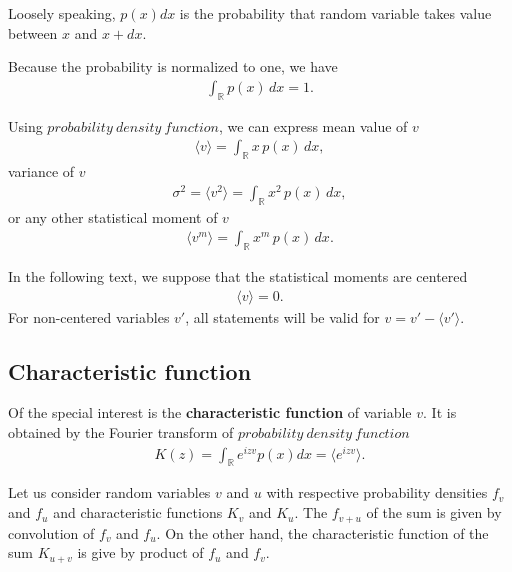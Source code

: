 Loosely speaking, $p(x)dx$ is the probability that random variable takes value between $x$ and $x+dx$.

Because the probability is normalized to one, we have
\begin{align}
\int_{\mathbb{R}} p(x) \, dx = 1.
\end{align}

Using $probability~density~function$, we can express mean value of $v$
\begin{align}
\langle v \rangle = \int_{\mathbb{R}} x \, p(x) \, dx ,
\end{align}
variance of $v$
\begin{align}
\sigma^2 = \langle v^2 \rangle = \int_{\mathbb{R}} x^2 \, p(x) \, dx ,
\end{align}
or any other statistical moment of $v$
\begin{align}
\langle v^m \rangle = \int_{\mathbb{R}} x^m \, p(x) \, dx.
\end{align}

In the following text, we suppose that the statistical moments are centered
\begin{align*}
\langle v \rangle = 0.
\end{align*}
For non-centered variables $v'$, all statements will be valid for $v = v' - \langle v' \rangle$.

\subsection{Characteristic function}

Of the special interest is the \textbf{characteristic function} of variable $v$. It is obtained by the Fourier transform of $probability~density~function$
\begin{align*}
K(z) = \int_{\mathbb{R}} e^{izv} p(x) dx = \langle e^{izv} \rangle.
\end{align*}

Let us consider random variables $v$ and $u$ with respective probability densities $f_v$ and $f_u$ and characteristic functions $K_v$ and $K_u$. The $f_{v+u}$ of the sum is given by convolution of $f_v$ and $f_u$. On the other hand, the characteristic function of the sum $K_{u+v}$ is give by product of $f_u$ and $f_v$.

